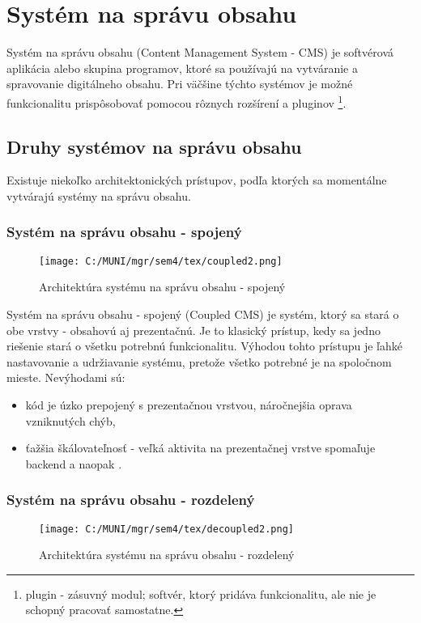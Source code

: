 \documentclass[
  printed, %
  table,   %
  lof,     %
  nolot,     %
  twoside,  
]{fithesis3}
\begin{document}
\chapter{Systém na správu obsahu}
Systém na správu obsahu (Content Management System - CMS) je softvérová aplikácia alebo skupina programov, ktoré sa používajú na vytváranie a spravovanie digitálneho obsahu. Pri väčšine týchto systémov je možné funkcionalitu prispôsobovať pomocou rôznych rozšírení a pluginov \footnote{plugin - zásuvný modul; softvér, ktorý pridáva funkcionalitu, ale nie je schopný pracovať samostatne.}.
\section{Druhy systémov na správu obsahu}
Existuje niekoľko architektonických prístupov, podľa ktorých sa momentálne vytvárajú systémy na správu obsahu.
\subsection{Systém na správu obsahu - spojený}
\begin{figure}[h]
  \begin{center}
        \texttt{[image: C:/MUNI/mgr/sem4/tex/coupled2.png]}
  \end{center}
  \caption{Architektúra systému na správu obsahu - spojený}
  \label{fig:coupled}
\end{figure}

Systém na správu obsahu - spojený (Coupled CMS) je systém, ktorý sa stará o obe vrstvy - obsahovú aj prezentačnú. Je to klasický prístup, kedy sa jedno riešenie stará o všetku potrebnú funkcionalitu. 
Výhodou tohto prístupu je ľahké nastavovanie a udržiavanie systému, pretože všetko potrebné je na spoločnom mieste. Nevýhodami sú: 
\begin{itemize}
 \item kód je úzko prepojený s prezentačnou vrstvou, náročnejšia oprava vzniknutých chýb,
 \item ťažšia škálovateľnosť - veľká aktivita na prezentačnej vrstve spomaľuje backend a naopak \cite{cmsGuide}.
\end{itemize} 


\subsection{Systém na správu obsahu - rozdelený}
\begin{figure}[h]
  \begin{center}
        \texttt{[image: C:/MUNI/mgr/sem4/tex/decoupled2.png]}
  \end{center}
  \caption{Architektúra systému na správu obsahu - rozdelený}
  \label{fig:decoupled}
\end{figure}
\end{document}
